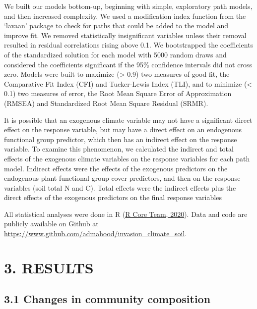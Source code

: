 \documentclass[
  11pt,
  a4paper,
]{article}
\begin{document}
We built our models bottom-up, beginning with simple, exploratory path models, and then increased complexity. We used a modification index function from the `lavaan' package to check for paths that could be added to the model and improve fit. We removed statistically insignificant variables unless their removal resulted in residual correlations rising above 0.1. We bootstrapped the coefficients of the standardized solution for each model with 5000 random draws and considered the coefficients significant if the 95\% confidence intervals did not cross zero. Models were built to maximize (\textgreater{} 0.9) two measures of good fit, the Comparative Fit Index (CFI) and Tucker-Lewis Index (TLI), and to minimize (\textless{} 0.1) two measures of error, the Root Mean Square Error of Approximation (RMSEA) and Standardized Root Mean Square Residual (SRMR).

It is possible that an exogenous climate variable may not have a significant direct effect on the response variable, but may have a direct effect on an endogenous functional group predictor, which then has an indirect effect on the response variable. To examine this phenomenon, we calculated the indirect and total effects of the exogenous climate variables on the response variables for each path model. Indirect effects were the effects of the exogenous predictors on the endogenous plant functional group cover predictors, and then on the response variables (soil total N and C). Total effects were the indirect effects plus the direct effects of the exogenous predictors on the final response variables

All statistical analyses were done in R (\protect\hyperlink{ref-R}{R Core Team, 2020}). Data and code are publicly available on Github at \url{https://www.github.com/admahood/invasion_climate_soil}.

\hypertarget{results}{%
\section{3. RESULTS}\label{results}}

\hypertarget{changes-in-community-composition}{%
\subsection{3.1 Changes in community composition}\label{changes-in-community-composition}}
\end{document}
